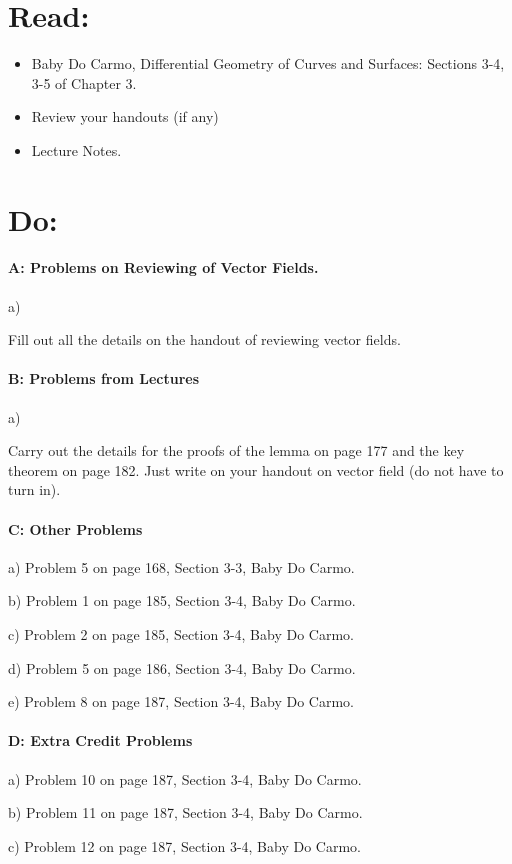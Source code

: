 \documentclass[12pt]{article}
\title{\rightline {\Huge {}}}
\author{\LARGE {HMC\quad Math 142 \quad Fall 2026} 
\\ {Prof. Gu}  
\\ {\LARGE Problem Set 8}}
\date{Start this assignment before Sunday night!}
\begin{document}
\maketitle

\section*{ Read: }

\begin{itemize}
	\item{Baby Do Carmo, Differential Geometry
		      of Curves and Surfaces:
		      Sections 3-4, 3-5 of Chapter 3.}
	\item{ Review your handouts (if any)}
	\item{Lecture Notes.}
\end{itemize}

\section*{ Do: }
\paragraph{A: Problems on Reviewing of Vector Fields.}
\begin{itemize}
	{\item a) } Fill out all the details on the handout of reviewing
	vector fields.
\end{itemize}

\medskip
\paragraph{B: Problems from Lectures}

\begin{itemize}
	{\item a)} Carry out the details for the proofs of the lemma on page 177 and
	the key theorem on page 182.  Just write on your handout on vector
	field (do not have to turn in).
\end{itemize}

\paragraph{C: Other Problems}
\begin{itemize}
	{\item a) Problem 5 on page 168,  Section 3-3, Baby Do Carmo.}
	{\item b) Problem 1 on page 185, Section 3-4, Baby Do Carmo.}
	{\item c) Problem 2 on page 185, Section 3-4, Baby Do Carmo.}
	{\item d) Problem 5 on page 186, Section 3-4, Baby Do Carmo.}
	{\item e) Problem 8 on page 187, Section 3-4, Baby Do Carmo.}

\end{itemize}

\paragraph{D: Extra Credit Problems}
\begin{itemize}
	{\item a) Problem 10 on page 187,  Section 3-4, Baby Do Carmo.}
	{\item b) Problem 11 on page 187,  Section 3-4, Baby Do Carmo.}
	{\item c) Problem 12 on page 187,  Section 3-4, Baby Do Carmo.}
\end{itemize}
\end{document}
